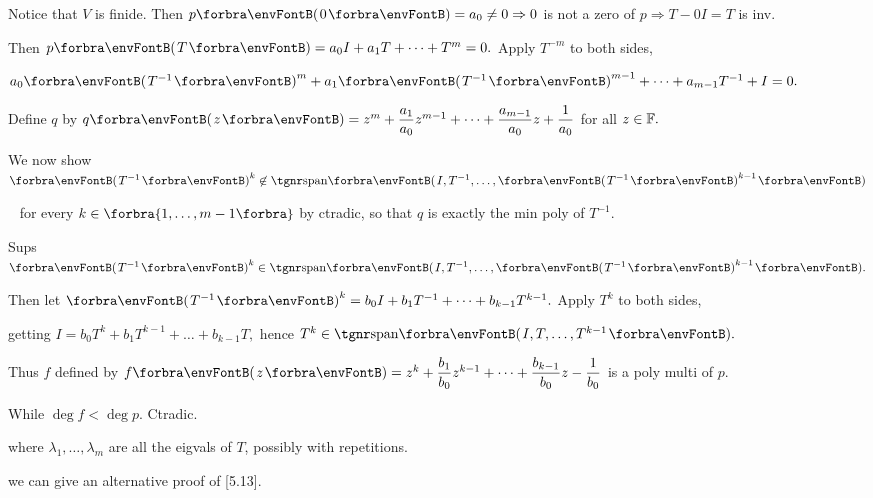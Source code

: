 \par\quad
Notice that $V$ is finide. Then $p\Par{0}=a_0\neq 0\Rightarrow 0$ is not a zero of $p\Rightarrow T-0I=T$ is inv.\par\quad
Then $p\Par{T}=a_0 I+a_1 T+\dots+T^m=0.$ Apply $T^{-m}$ to both sides,\par\quad
$a_0\Par{T^{-1}}^m+a_1\Par{T^{-1}}^{m-1}+\dots+a_{m-1}T^{-1}+I=0.$\par\quad
Define $q$ by $q\Par{z}=z^m+\Frac{a_1}{a_0} z^{m-1}+\dots+\Frac{a_{m-1}}{a_0}z+\Frac{1}{a_0}$ for all $z\in{\mathbb{F}}.$\par\vspace{6pt}\quad
We now show $\Par{T^{-1}}^k\not\in\Span{I,T^{-1},\dots,\Par{T^{-1}}^{k-1}}$\par\qquad\qquad\qquad\,\,\,
for every $k\in\Bra{1,\dots,m-1}$ by ctradic, so that $q$ is exactly the min poly of $T^{-1}.$\par\quad
Sups $\Par{T^{-1}}^k\in\Span{I,T^{-1},\dots,\Par{T^{-1}}^{k-1}}.$\par\quad
Then let $\Par{T^{-1}}^k=b_0 I+b_1 T^{-1}+\dots+b_{k-1}T^{k-1}.$ Apply $T^k$ to both sides,\par\qquad\qquad
 getting $I=b_0 T^k+b_1 T^{k-1}+\dots+b_{k-1}T,$ hence $T^k\in\Span{I,T,\dots,T^{k-1}}.$\par\vspace{6pt}\quad
Thus $f$ defined by $f\Par{z}=z^k+\Frac{b_1}{b_0} z^{k-1}+\dots+\Frac{b_{k-1}}{b_0} z-\Frac{1}{b_0}$ is a poly multi of $p$.\par\quad
While $\deg f<\deg p.$ Ctradic.\PfEnd
\SepLine

\BulletPointX\NoteForSmall{[8.49]}\TextB{}
{\tgsl\large where $\lambda_1,\dots,\lambda_m$ are all the eigvals of $T$, {\tgsc possibly with repetitions}.}\par
\BulletPointX\Comment\TextB{}
we can {\tgsc give an alternative proof of [5.13]}.
\SepLine

